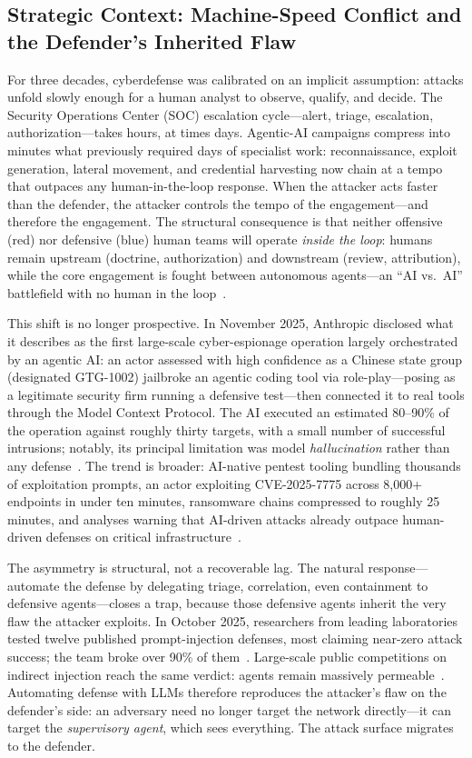 \documentclass[conference]{IEEEtran}
\begin{document}
\subsection{Strategic Context: Machine-Speed Conflict and the
Defender's Inherited Flaw}
For three decades, cyberdefense was calibrated on an implicit assumption:
attacks unfold slowly enough for a human analyst to observe, qualify, and
decide. The Security Operations Center (SOC) escalation cycle---alert,
triage, escalation, authorization---takes hours, at times days. Agentic-AI
campaigns compress into minutes what previously required days of specialist
work: reconnaissance, exploit generation, lateral movement, and credential
harvesting now chain at a tempo that outpaces any human-in-the-loop
response. When the attacker acts faster than the defender, the attacker
controls the tempo of the engagement---and therefore the engagement. The
structural consequence is that neither offensive (red) nor defensive (blue)
human teams will operate \emph{inside the loop}: humans remain upstream
(doctrine, authorization) and downstream (review, attribution), while the
core engagement is fought between autonomous agents---an ``AI vs.\ AI''
battlefield with no human in the
loop~\cite{sify2025aivsai, boozallen2025}.

This shift is no longer prospective. In November 2025, Anthropic disclosed
what it describes as the first large-scale cyber-espionage operation
largely orchestrated by an agentic AI: an actor assessed with high
confidence as a Chinese state group (designated GTG-1002) jailbroke an
agentic coding tool via role-play---posing as a legitimate security firm
running a defensive test---then connected it to real tools through the
Model Context Protocol. The AI executed an estimated 80--90\% of the
operation against roughly thirty targets, with a small number of successful
intrusions; notably, its principal limitation was model \emph{hallucination}
rather than any defense~\cite{anthropic2025espionage}. The trend is broader:
AI-native pentest tooling bundling thousands of exploitation prompts, an
actor exploiting CVE-2025-7775 across 8{,}000+ endpoints in under ten
minutes, ransomware chains compressed to roughly 25 minutes, and analyses
warning that AI-driven attacks already outpace human-driven defenses on
critical infrastructure~\cite{picus2025machinespeed, boozallen2025}.

The asymmetry is structural, not a recoverable lag. The natural
response---automate the defense by delegating triage, correlation, even
containment to defensive agents---closes a trap, because those defensive
agents inherit the very flaw the attacker exploits. In October 2025,
researchers from leading laboratories tested twelve published
prompt-injection defenses, most claiming near-zero attack success; the team
broke over 90\% of them~\cite{carlini2025broke}. Large-scale public
competitions on indirect injection reach the same verdict: agents remain
massively permeable~\cite{injectioncomp2026}. Automating defense with LLMs
therefore reproduces the attacker's flaw on the defender's side: an
adversary need no longer target the network directly---it can target the
\emph{supervisory agent}, which sees everything. The attack surface migrates
to the defender.
\end{document}
